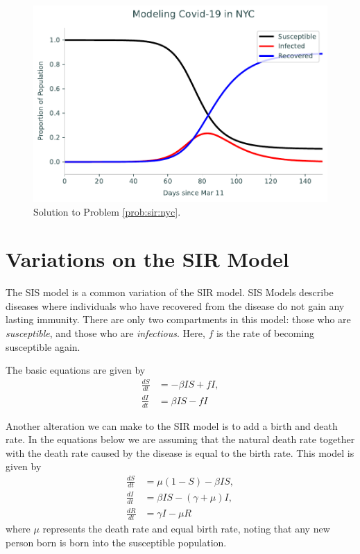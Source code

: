 \begin{figure}[h]
\centering
\includegraphics[width=\textwidth]{figures/SIR2.pdf}
\caption{Solution to Problem \ref{prob:sir:nyc}.}
\label{fig:sir:nyc-sol}
\end{figure}


\section*{Variations on the SIR Model}

The SIS model is a common variation of the SIR model.
SIS Models describe diseases where individuals who have recovered from the disease do not gain any lasting immunity.
There are only two compartments in this model: those who are \emph{susceptible}, and those who are \emph{infectious}.
Here, $f$ is the rate of becoming susceptible again.

The basic equations are given by
\begin{align*}
\frac{dS}{dt} &=-\beta I S + fI ,\\
\frac{dI}{dt} &= \beta I S - fI
\end{align*}

Another alteration we can make to the SIR model is to add a birth and death rate.
In the equations below we are assuming that the natural death rate together with the death rate caused by the disease is equal to the birth rate. This model is given by
\begin{align*}
\frac{dS}{dt} &=\mu(1 -S) - \beta I S,\\
\frac{dI}{dt} &= \beta I S - (\gamma + \mu)I, \\
\frac{dR}{dt} &= \gamma I - \mu R
\end{align*}
where $\mu$ represents the death rate and equal birth rate, noting that any new person born is born into the susceptible population.

